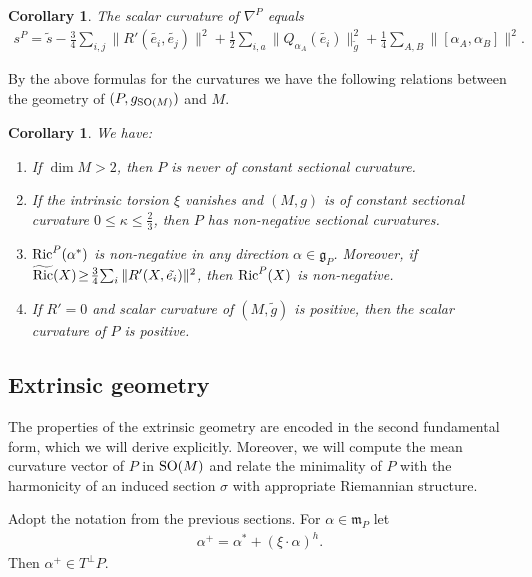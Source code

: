 \documentclass[10pt,a4paper]{amsart}
\numberwithin{equation}{section}
\newtheorem{Corollary}[Theorem]{Corollary}
\begin{document}
\begin{Corollary}\label{cor:scalarP}
The scalar curvature of $\nabla^P$ equals
\begin{gather*}
s^P=\tilde{s}-\frac{3}{4}\sum_{i,j}\|R'(\tilde{e_i},\tilde{e_j})\|^2+\frac{1}{2}\sum_{i,a}\|Q_{\alpha_A}(\tilde{e_i})\|^2_{\tilde{g}}
+\frac{1}{4}\sum_{A,B}\|[\alpha_A,\alpha_B]\|^2.
\end{gather*}
\end{Corollary}

By the above formulas for the curvatures we have the following relations between the geometry of $(P,g_{{\rm SO}(M)})$ and $M$.

\begin{Corollary}\label{cor:relPandtildeM}
We have:
\begin{enumerate}\itemsep=0pt
\item[$1.$] If $\dim M>2$, then $P$ is never of constant sectional curvature.
\item[$2.$]  If the intrinsic torsion $\xi$ vanishes and $(M,g)$ is of constant sectional curvature $0\leq \kappa\leq\frac{2}{3}$, then $P$ has non-negative sectional curvatures.
\item[$3.$]  ${\rm Ric}^P(\alpha^{\ast})$ is non-negative in any direction $\alpha\!\in\! \mathfrak{g}_P$. Moreover, if $\widetilde{\rm Ric}(X)\!\geq\! \frac{3}{4}\!\sum_i\|R'(X,\tilde{e_i})\|^2$, then ${\rm Ric}^P(X)$ is non-negative.
\item[$4.$]  If $R'=0$ and scalar curvature of $(M,\tilde{g})$ is positive, then the scalar curvature of $P$ is positive.
\end{enumerate}
\end{Corollary}

\subsection{Extrinsic geometry}

The properties of the extrinsic geometry are encoded in the second fundamental form, which we will derive explicitly. Moreover, we will compute the mean curvature vector of $P$ in ${\rm SO}(M)$ and relate the minimality of $P$ with the harmonicity of an induced section $\sigma$ with appropriate Riemannian structure.

Adopt the notation from the previous sections. For $\alpha\in\mathfrak{m}_P$ let
\begin{gather*}
\alpha^{+}=\alpha^{\ast}+(\xi\cdot\alpha)^h.
\end{gather*}
Then $\alpha^{+}\in T^{\bot}P$.
\end{document}
